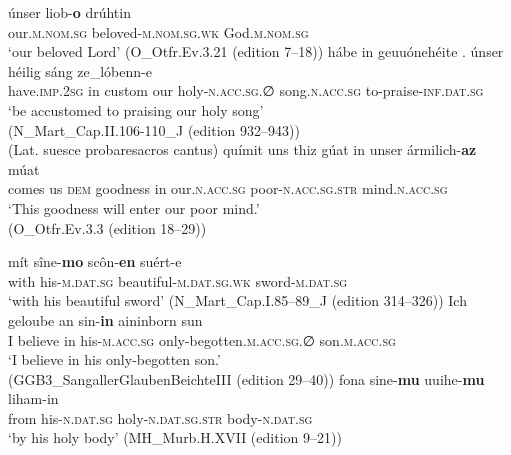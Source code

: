 \documentclass[output=paper,colorlinks,citecolor=brown]{langscibook}
\begin{document}
\begin{exe}
\ex\label{ch6ex30}\begin{xlist}
\ex\label{ch6ex30a}
\gll  únser liob-\textbf{o} drúhtin\\
our.\textsc{m.nom.sg} beloved-\textsc{m.nom.sg.wk} God.\textsc{m.nom.sg}\\
\glt `our beloved Lord' (O\_Otfr.Ev.3.21 (edition 7--18))
\ex\label{ch6ex30b} 
\gll hábe in geuuónehéite . únser héilig sáng ze\_lóbenn-e\\
have.\textsc{imp.2sg} in custom {} our holy-\textsc{n.acc.sg.∅} song.\textsc{n.acc.sg} to-praise-\textsc{inf.dat.sg}\\
\glt `be accustomed to praising our holy song'\\(N\_Mart\_Cap.II.106-110\_J (edition 932--943)) \\
 (Lat. suesce probaresacros cantus)
\ex\label{ch6ex30c} 
\gll químit uns thiz gúat in unser ármilich-\textbf{az} múat\\
comes us \textsc{dem} goodness in our.\textsc{n.acc.sg} poor-\textsc{n.acc.sg.str} mind.\textsc{n.acc.sg}\\
\glt `This goodness will enter our poor mind.' \\ (O\_Otfr.Ev.3.3 (edition 18--29))
\end{xlist}
\end{exe}

\begin{exe}
\ex\label{ch6ex31}\begin{xlist}
\ex\label{ch6ex31a}
\gll  mít sîne-\textbf{mo} scôn-\textbf{en} suért-e\\
with his-\textsc{m.dat.sg} beautiful-\textsc{m.dat.sg.wk} sword-\textsc{m.dat.sg}\\
\glt `with his beautiful sword' (N\_Mart\_Cap.I.85--89\_J (edition 314--326))
\ex\label{ch6ex31b} 
\gll Ich geloube an sin-\textbf{in} aininborn sun\\
I believe in his-\textsc{m.acc.sg} only-begotten.\textsc{m.acc.sg.∅} son.\textsc{m.acc.sg}\\
\glt `I believe in his only-begotten son.'\\(GGB3\_SangallerGlaubenBeichteIII (edition 29--40))
\ex\label{ch6ex31c} 
\gll fona sine-\textbf{mu} uuihe-\textbf{mu} liham-in\\
from his-\textsc{n.dat.sg} holy-\textsc{n.dat.sg.str} body-\textsc{n.dat.sg}\\
\glt `by his holy body' (MH\_Murb.H.XVII (edition 9--21))
\end{xlist}
\end{exe}
\end{document}
